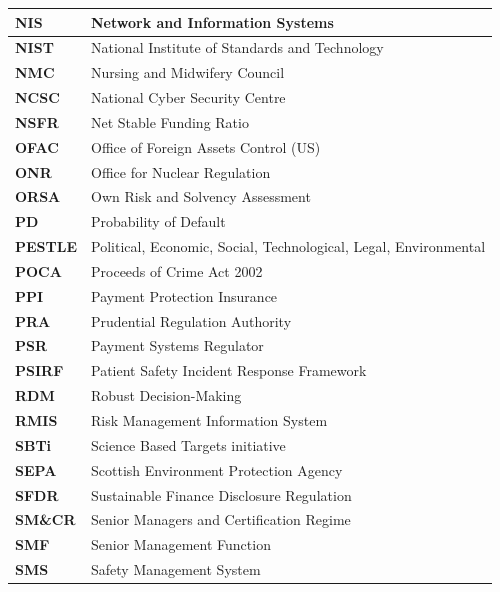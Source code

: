\begin{longtable}{ | >{\raggedright\arraybackslash}p{} 
                  | >{\raggedright\arraybackslash}p{} | }
        \hline
        \textbf{NIS} & Network and Information Systems \\
        \hline
        \textbf{NIST} & National Institute of Standards and Technology \\
        \hline
        \textbf{NMC} & Nursing and Midwifery Council \\
        \hline
        \textbf{NCSC} & National Cyber Security Centre \\
        \hline
        \textbf{NSFR} & Net Stable Funding Ratio \\
        \hline
        \textbf{OFAC} & Office of Foreign Assets Control (US) \\
        \hline
        \textbf{ONR} & Office for Nuclear Regulation \\
        \hline
        \textbf{ORSA} & Own Risk and Solvency Assessment \\
        \hline
        \textbf{PD} & Probability of Default \\
        \hline
        \textbf{PESTLE} & Political, Economic, Social, Technological, Legal, Environmental \\
        \hline
        \textbf{POCA} & Proceeds of Crime Act 2002 \\
        \hline
        \textbf{PPI} & Payment Protection Insurance \\
        \hline
        \textbf{PRA} & Prudential Regulation Authority \\
        \hline
        \textbf{PSR} & Payment Systems Regulator \\
        \hline
        \textbf{PSIRF} & Patient Safety Incident Response Framework \\
        \hline
        \textbf{RDM} & Robust Decision-Making \\
        \hline
        \textbf{RMIS} & Risk Management Information System \\
        \hline
        \textbf{SBTi} & Science Based Targets initiative \\
        \hline
        \textbf{SEPA} & Scottish Environment Protection Agency \\
        \hline
        \textbf{SFDR} & Sustainable Finance Disclosure Regulation \\
        \hline
        \textbf{SM\&CR} & Senior Managers and Certification Regime \\
        \hline
        \textbf{SMF} & Senior Management Function \\
        \hline
        \textbf{SMS} & Safety Management System \\

\end{longtable}
